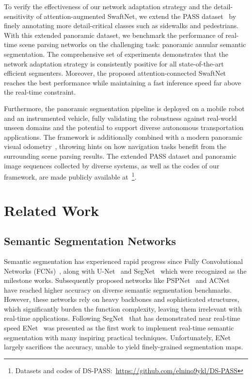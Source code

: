 \documentclass[letterpaper, 10 pt, conference]{ieeeconf}
\begin{document}
To verify the effectiveness of our network adaptation strategy and the detail-sensitivity of attention-augmented SwaftNet, we extend the PASS dataset~\cite{yang2019can}\cite{yang2019pass} by finely annotating more detail-critical classes such as sidewalks and pedestrians. With this extended panoramic dataset, we benchmark the performance of real-time scene parsing networks on the challenging task: panoramic annular semantic segmentation. The comprehensive set of experiments demonstrates that the network adaptation strategy is consistently positive for all state-of-the-art efficient segmenters. Moreover, the proposed attention-connected SwaftNet reaches the best performance while maintaining a fast inference speed far above the real-time constraint. 

Furthermore, the panoramic segmentation pipeline is deployed on a mobile robot and an instrumented vehicle, fully validating the robustness against real-world unseen domains and the potential to support diverse autonomous transportation applications. The framework is additionally combined with a modern panoramic visual odometry~\cite{chen2019palvo}, throwing hints on how navigation tasks benefit from the surrounding scene parsing results. The extended PASS dataset and panoramic image sequences collected by diverse systems, as well as the codes of our framework, are made publicly available at~\footnote{Datasets and codes of DS-PASS:~\url{https://github.com/elnino9ykl/DS-PASS}}. 

\section{Related Work}

\subsection{Semantic Segmentation Networks}

Semantic segmentation has experienced rapid progress since Fully Convolutional Networks (FCNs)~\cite{long2015fully}, along with U-Net~\cite{ronneberger2015u} and SegNet~\cite{badrinarayanan2017segnet} which were recognized as the milestone works. Subsequently proposed networks like PSPNet~\cite{zhao2017pyramid} and ACNet~\cite{hu2019acnet} have reached higher accuracy on diverse semantic segmentation benchmarks. However, these networks rely on heavy backbones and sophisticated structures, which significantly burden the function complexity, leaving them irrelevant with real-time applications. Following SegNet~\cite{badrinarayanan2017segnet} that has demonstrated near real-time speed
ENet~\cite{paszke2016enet} was presented as the first work to implement real-time semantic segmentation with many inspiring practical techniques. Unfortunately, ENet largely sacrifices the accuracy, unable to yield finely-grained segmentation maps.
\end{document}
